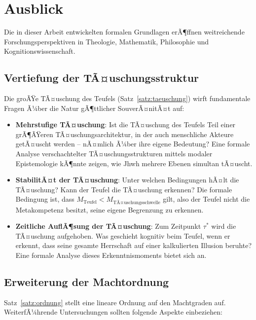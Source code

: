 ﻿\documentclass[a4paper,12pt]{article}
\theoremstyle{definition}
\begin{document}
\section{Ausblick}

Die in dieser Arbeit entwickelten formalen Grundlagen erÃ¶ffnen weitreichende
Forschungsperspektiven in Theologie, Mathematik, Philosophie und
Kognitionswissenschaft.

\subsection{Vertiefung der TÃ¤uschungsstruktur}

Die groÃŸe TÃ¤uschung des Teufels (Satz~\ref{satz:taeuschung}) wirft fundamentale
Fragen Ã¼ber die Natur gÃ¶ttlicher SouverÃ¤nitÃ¤t auf:

\begin{itemize}
  \item \textbf{Mehrstufige TÃ¤uschung}: Ist die TÃ¤uschung des Teufels Teil
        einer grÃ¶ÃŸeren TÃ¤uschungsarchitektur, in der auch menschliche Akteure
        getÃ¤uscht werden -- nÃ¤mlich Ã¼ber ihre eigene Bedeutung? Eine formale
        Analyse verschachtelter TÃ¤uschungsstrukturen mittels modaler Epistemologie
        \cite{fagin1995} kÃ¶nnte zeigen, wie Jhwh mehrere Ebenen simultan tÃ¤uscht.
  \item \textbf{StabilitÃ¤t der TÃ¤uschung}: Unter welchen Bedingungen hÃ¤lt die
        TÃ¤uschung? Kann der Teufel die TÃ¤uschung erkennen? Die formale
        Bedingung ist, dass $M_{\mathrm{Teufel}} < M_{\text{TÃ¤uschungsschwelle}}$
        gilt, also der Teufel nicht die Metakompetenz besitzt, seine eigene
        Begrenzung zu erkennen.
  \item \textbf{Zeitliche AuflÃ¶sung der TÃ¤uschung}: Zum Zeitpunkt $\tau^*$
        wird die TÃ¤uschung aufgehoben. Was geschieht kognitiv beim Teufel, wenn
        er erkennt, dass seine gesamte Herrschaft auf einer kalkulierten Illusion
        beruhte? Eine formale Analyse dieses Erkenntnismoments bietet sich an.
\end{itemize}

\subsection{Erweiterung der Machtordnung}

Satz~\ref{satz:ordnung} stellt eine lineare Ordnung auf den Machtgraden auf.
WeiterfÃ¼hrende Untersuchungen sollten folgende Aspekte einbeziehen:
\end{document}
